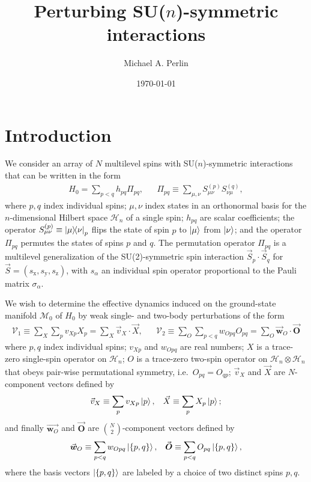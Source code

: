 \documentclass[nofootinbib,notitlepage,11pt]{revtex4-2}
\newcommand{\p}[1]{\left(#1\right)} %
\renewcommand{\set}[1]{\left\{#1\right\}} %
\renewcommand{\c}{\cdot} %
\newcommand{\m}{\bm} %
\renewcommand{\v}{\vec} %
\newcommand{\1}{\mathds{1}}
\newcommand{\x}{\text{x}}
\newcommand{\y}{\text{y}}
\newcommand{\z}{\text{z}}
\renewcommand{\H}{\mathcal{H}}
\newcommand{\M}{\mathcal{M}}
\newcommand{\V}{\mathcal{V}}
\begin{document}
\title{Perturbing SU($n$)-symmetric interactions}%
\author{Michael A. Perlin}%
\date{\today}

\maketitle

\tableofcontents

\section{Introduction}

We consider an array of $N$ multilevel spins with SU($n$)-symmetric
interactions that can be written in the form
\begin{align}
  H_0 = \sum_{p<q} h_{pq} \Pi_{pq},
  &&
  \Pi_{pq} \equiv \sum_{\mu,\nu} S_{\mu\nu}^{(p)} S_{\nu\mu}^{(q)},
  \label{eq:ints}
\end{align}
where $p,q$ index individual spins; $\mu,\nu$ index states in an
orthonormal basis for the $n$-dimensional Hilbert space $\H_n$ of a
single spin; $h_{pq}$ are scalar coefficients; the operator
$S_{\mu\nu}^{(p)}\equiv\op{\mu}{\nu}_p$ flips the state of spin $p$ to
$\ket\mu$ from $\ket\nu$; and the operator $\Pi_{pq}$ permutes the
states of spins $p$ and $q$.  The permutation operator $\Pi_{pq}$ is a
multilevel generalization of the SU(2)-symmetric spin interaction
$\v S_p\c\v S_q$ for $\v S=\p{s_\x,s_\y,s_\z}$, with $s_\alpha$ an
individual spin operator proportional to the Pauli matrix
$\sigma_\alpha$.

We wish to determine the effective dynamics induced on the
ground-state manifold $\M_0$ of $H_0$ by weak single- and two-body
perturbations of the form
\begin{align}
  \V_1 \equiv \sum_X \sum_p v_{Xp} X_p = \sum_X \v v_X\c\v X,
  &&
  \V_2 \equiv \sum_O \sum_{p<q} w_{Opq} O_{pq}
  = \sum_O \v{\m w}_O\c \v{\m O}
  \label{eq:perturbations}
\end{align}
where $p,q$ index individual spins; $v_{Xp}$ and $w_{Opq}$ are real
numbers; $X$ is a trace-zero single-spin operator on $\H_n$; $O$ is a
trace-zero two-spin operator on $\H_n\otimes\H_n$ that obeys pair-wise
permutational symmetry, i.e.~$O_{pq}=O_{qp}$; $\v v_X$ and $\v X$ are
$N$-component vectors defined by
\begin{align}
  \v v_X \equiv \sum_p v_{Xp} \ket{p},
  &&
  \v X \equiv \sum_p X_p \ket{p};
\end{align}
and finally $\v{\m w_O}$ and $\v{\m O}$ are ${N \choose 2}$-component
vectors defined by
\begin{align}
  \v{\m w}_O \equiv \sum_{p<q} w_{Opq} \ket{\set{p,q}},
  &&
  \v{\m O} \equiv \sum_{p<q} O_{pq} \ket{\set{p,q}},
\end{align}
where the basis vectors $\ket{\set{p,q}}$ are labeled by a choice of
two distinct spins $p,q$.
\end{document}
